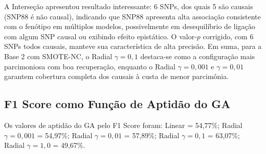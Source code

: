 \documentclass[
    12pt,
    a4paper,
    oneside,
    english,
    french,
    spanish,
    brazil
    ]{abntex2}
\newcommand{\novo}[1]{\textcolor{corNova}{#1}}
\begin{document}
\novo{A Interseção apresentou resultado interessante: 6 SNPs, dos quais 5 são causais (SNP88 é não causal), indicando que SNP88 apresenta alta associação consistente com o fenótipo em múltiplos modelos, possivelmente em desequilíbrio de ligação com algum SNP causal ou exibindo efeito epistático. O valor-$p$ corrigido, com 6 SNPs todos causais, manteve sua característica de alta precisão. Em suma, para a Base 2 com SMOTE-NC, o Radial $\gamma = 0{,}1$ destaca-se como a configuração mais parcimoniosa com boa recuperação, enquanto o Radial $\gamma = 0{,}001$ e $\gamma = 0{,}01$ garantem cobertura completa dos causais à custa de menor parcimônia.}

\subsection{F1 Score como Função de Aptidão do GA}

\novo{Os valores de aptidão do GA pelo F1 Score foram: Linear = 54,77\%; Radial $\gamma{=}0{,}001$ = 54,97\%; Radial $\gamma{=}0{,}01$ = 57,89\%; Radial $\gamma{=}0{,}1$ = 63,07\%; Radial $\gamma{=}1{,}0$ = 49,67\%.}
\end{document}
